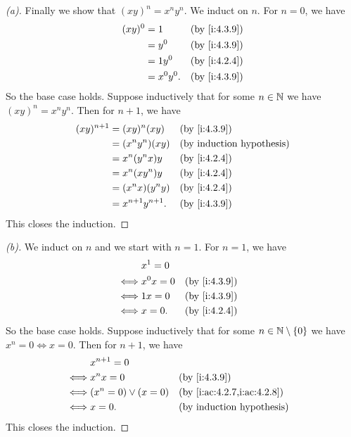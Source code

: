 \begin{proof}[(a)]
  Finally we show that \((xy)^n = x^n y^n\).
  We induct on \(n\).
  For \(n = 0\), we have
  \begin{align*}
    (xy)^0 & = 1        &  & \by{i:4.3.9} \\
           & = y^0      &  & \by{i:4.3.9} \\
           & = 1y^0     &  & \by{i:4.2.4} \\
           & = x^0 y^0. &  & \by{i:4.3.9}
  \end{align*}
  So the base case holds.
  Suppose inductively that for some \(n \in \mathbb{N}\) we have \((xy)^n = x^n y^n\).
  Then for \(n + 1\), we have
  \begin{align*}
    (xy)^{n + 1} & = (xy)^n (xy)          &  & \by{i:4.3.9} \\
                 & = (x^n y^n) (xy)       &  & \byIH        \\
                 & = x^n (y^n x) y        &  & \by{i:4.2.4} \\
                 & = x^n (x y^n) y        &  & \by{i:4.2.4} \\
                 & = (x^n x)(y^n y)       &  & \by{i:4.2.4} \\
                 & = x^{n + 1} y^{n + 1}. &  & \by{i:4.3.9}
  \end{align*}
  This closes the induction.
\end{proof}

\begin{proof}[(b)]
  We induct on \(n\) and we start with \(n = 1\).
  For \(n = 1\), we have
  \begin{align*}
         & x^1 = 0                     \\
    \iff & x^0 x = 0 &  & \by{i:4.3.9} \\
    \iff & 1x = 0    &  & \by{i:4.3.9} \\
    \iff & x = 0.    &  & \by{i:4.2.4}
  \end{align*}
  So the base case holds.
  Suppose inductively that for some \(n \in \mathbb{N} \setminus \left\lbrace0\right\rbrace\) we have \(x^n = 0 \iff x = 0\).
  Then for \(n + 1\), we have
  \begin{align*}
         & x^{n + 1} = 0                                          \\
    \iff & x^n x = 0              &  & \by{i:4.3.9}               \\
    \iff & (x^n = 0) \lor (x = 0) &  & \by{i:ac:4.2.7,i:ac:4.2.8} \\
    \iff & x = 0.                 &  & \byIH
  \end{align*}
  This closes the induction.
\end{proof}

